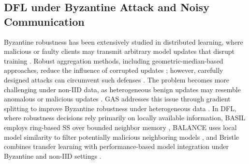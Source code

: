 \documentclass[conference]{IEEEtran}
\begin{document}


\subsection{DFL under Byzantine Attack and Noisy Communication}
Byzantine robustness has been extensively studied in distributed learning, where malicious or faulty clients may transmit arbitrary model updates that disrupt training \cite{Byzantine_Tolerant_GD}. Robust aggregation methods, including geometric-median-based approaches, reduce the influence of corrupted updates \cite{geometric_median}; however, carefully designed attacks can circumvent such defenses \cite{fall_of_empires,analyzing_fl_adversarial}. The problem becomes more challenging under non-IID data, as heterogeneous benign updates may resemble anomalous or malicious updates \cite{byzantine_robust_hetero}. GAS addresses this issue through gradient splitting to improve Byzantine robustness under heterogeneous data \cite{gas}. In DFL, where robustness decisions rely primarily on locally available information, BASIL employs ring-based SS over bounded neighbor memory \cite{basil}, BALANCE uses local model similarity to filter potentially malicious neighboring models \cite{balance}, and Bristle combines transfer learning with performance-based model integration under Byzantine and non-IID settings \cite{bristle}.
\end{document}
